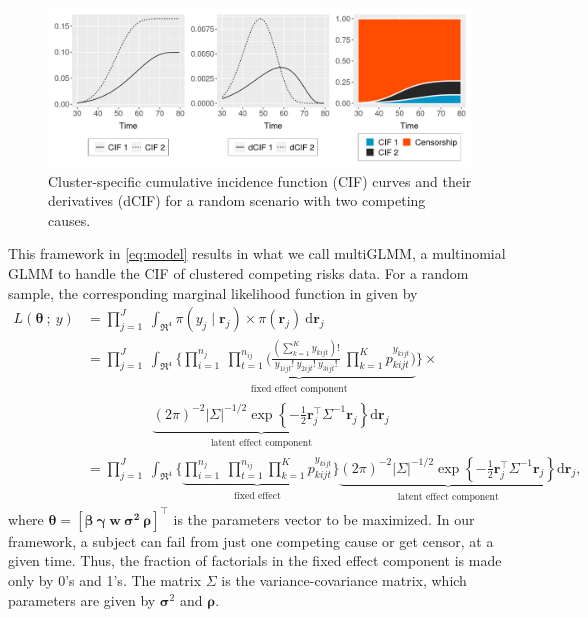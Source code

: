 \documentclass[a4paper,12pt]{article}
\begin{document}
\begin{figure}[H]
 \centering \includegraphics[width=\linewidth]{pics/modelsample-1.png}
 \vspace{-0.75cm}
 \caption{Cluster-specific cumulative incidence function (CIF) curves
   and their derivatives (dCIF) for a random scenario with two competing
   causes.}
 \label{fig:modelsample}
\end{figure}

This framework in \autoref{eq:model} results in what we call multiGLMM,
a multinomial GLMM to handle the CIF of clustered competing risks
data. For a random sample, the corresponding marginal likelihood
function in given by
\begin{align}
 L(\bm{\theta}~;~y)
 &= \prod_{j=1}^{J}~\int_{\Re^{4}}
    \pi(y_{j} \mid \bm{r}_{j})\times\pi(\bm{r}_{j})~\text{d}\bm{r}_{j}
    \nonumber\\
 &= \prod_{j=1}^{J}~\int_{\Re^{4}}
    \Bigg\{
    \underbrace{\prod_{i=1}^{n_{j}}~\prod_{t=1}^{n_{ij}}
    \Bigg(
    \frac{(\sum_{k=1}^{K}y_{kijt})!}{y_{1ijt}!~y_{2ijt}!~y_{3ijt}!}~
    \prod_{k=1}^{K} p_{kijt}^{y_{kijt}}
    \Bigg)}_{\substack{\text{fixed effect component}}}
  \Bigg\}\times\nonumber\\
 &\hspace{2cm}\underbrace{
   (2\pi)^{-2} |\Sigma|^{-1/2} \exp
   \left\{-\frac{1}{2}\bm{r}_{j}^{\top} \Sigma^{-1} \bm{r}_{j}\right\}
   }_{\substack{\text{latent effect component}}}
   \text{d}\bm{r}_{j}\nonumber\\
 &= \prod_{j=1}^{J}~\int_{\Re^{4}}
    \Bigg\{
    \underbrace{\prod_{i=1}^{n_{j}}~\prod_{t=1}^{n_{ij}}
    \prod_{k=1}^{K} p_{kijt}^{y_{kijt}}
    }_{\substack{\text{fixed effect}}}
   \Bigg\}\underbrace{
   (2\pi)^{-2} |\Sigma|^{-1/2} \exp
   \left\{-\frac{1}{2}\bm{r}_{j}^{\top} \Sigma^{-1} \bm{r}_{j}\right\}
   }_{\substack{\text{latent effect component}}}
   \text{d}\bm{r}_{j}\label{eq:loglik},
\end{align}
where \(\bm{\theta} = [\bm{\beta}~\bm{\gamma}~\bm{w}~\bm{\sigma^{2}}~
  \bm{\rho}]^{\top}\) is the parameters vector to be maximized. In our
framework, a subject can fail from just one competing cause or get
censor, at a given time. Thus, the fraction of factorials in the fixed
effect component is made only by 0's and 1's. The matrix \(\Sigma\) is
the variance-covariance matrix, which parameters are given by
\(\bm{\sigma}^{2}\) and \(\bm{\rho}\).
\end{document}
